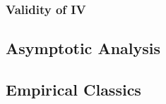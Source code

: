 \documentclass[10pt]{report}
\begin{document}
\subsubsection{Validity of IV}
\begin{center}
\end{center}

\subsection{Asymptotic Analysis}

\subsection{Empirical Classics}
\end{document}
